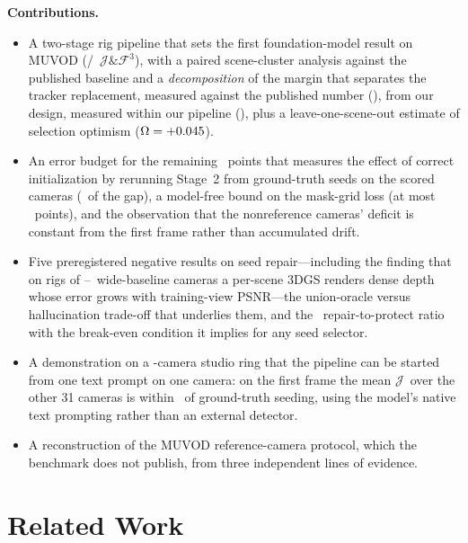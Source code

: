 \documentclass[journal]{IEEEtran}
\newcommand{\Jscore}{\ensuremath{\mathcal{J}}}
\newcommand{\JF}{\ensuremath{\mathcal{J}\&\mathcal{F}^{3}}}
\begin{document}
\noindent\textbf{Contributions.}
\begin{itemize}
  \item A two-stage rig pipeline that sets the first foundation-model result on
        MUVOD (\OursBasic/\OursComplete\ \JF), with a paired scene-cluster
        analysis against the published baseline and a \emph{decomposition} of
        the margin that separates the tracker replacement, measured against the
        published number (\gainFoundation), from our design, measured within
        our pipeline (\gainOurs), plus a leave-one-scene-out estimate of
        selection optimism ($\Omega=+0.045$).
  \item An error budget for the remaining \totalGap\ points that measures the
        effect of correct initialization by rerunning Stage~2 from
        ground-truth seeds on the scored cameras (\gtSeedHeadlineDelta\ of the
        gap), a model-free bound on the
        mask-grid loss (at most \lossNow\ points), and the observation that the
        nonreference cameras' deficit is constant from the first frame rather
        than accumulated drift.
  \item Five preregistered negative results on seed repair---including the
        finding that on rigs of \gsViewsMin--\gsViewsMax\ wide-baseline cameras
        a per-scene 3DGS renders dense depth whose error grows with
        training-view PSNR---the union-oracle versus
        hallucination trade-off that underlies them, and the \asymmetry\ repair-to-protect ratio with the break-even
        condition it implies for any seed selector.
  \item A demonstration on a \plenCams-camera studio ring that the pipeline
        can be started from one text prompt on one camera: on the first
        frame the mean \Jscore\ over the other 31 cameras is within
        \plenDeltaTxt\ of ground-truth seeding, using the model's native text
        prompting rather than an external detector.
  \item A reconstruction of the MUVOD reference-camera protocol, which the
        benchmark does not publish, from three independent lines of evidence.
\end{itemize}

\section{Related Work}
\label{sec:related}
\end{document}
